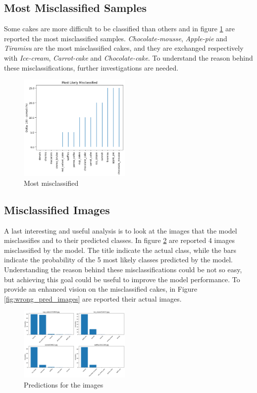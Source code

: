 \documentclass{article}
\begin{document}
\begin{multicols}{2}
\subsection{Most Misclassified Samples}
Some cakes are more difficult to be classified than others and in figure \ref{fig:mostmis} are reported the most misclassified samples. \textit{Chocolate-mousse}, \textit{Apple-pie} and \textit{Tiramisu} are the most 
misclassified cakes, and they are exchanged respectively with \textit{Ice-cream}, \textit{Carrot-cake} and \textit{Chocolate-cake}. To understand the reason behind these misclassifications, further investigations are needed.

    \begin{figure}[H]
        \centering
        \includegraphics[width=0.48\textwidth]{mostmis.png}
        \caption{\small Most misclassified}
        \label{fig:mostmis}
    \end{figure}


\subsection{Misclassified Images}
A last interesting and useful analysis is to look at the images that the model misclassifies and to their predicted classes. In figure \ref{fig:wrong_pred} are reported 4 images misclassified
by the model. The title indicate the actual class, while the bars indicate the probability of the 5 most likely classes predicted by the model. Understanding the reason behind these
misclassifications could be not so easy, but achieving this goal could be useful to improve the model performance. To provide an enhanced vision on the misclassified cakes, 
in Figure \ref{fig:wrong_pred_images} are reported their actual images.

    \begin{figure}[H]
        \centering
        \includegraphics[width=0.48\textwidth]{wrong_pred.png}
        \caption{\small Predictions for the images}
        \label{fig:wrong_pred}
    \end{figure}


\end{multicols}
\end{document}
